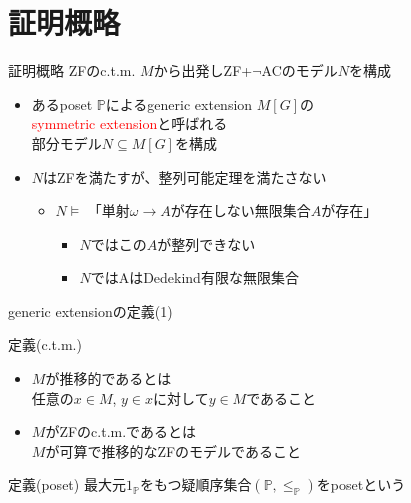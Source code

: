 \documentclass[17pt,aspectratio=169]{beamer}
\newcommand{\Pbb}{\mathbb{P}}
\begin{document}
\section{証明概略}
\begin{frame}{証明概略}
    \vspace{-4pt}
    ZFのc.t.m. $M$から出発しZF+$\neg$ACのモデル$N$を構成
    \vspace{-6pt}
    \begin{itemize}[itemsep=10pt]
        \item あるposet $\mathbb{P}$によるgeneric extension $M[G]$の\\
              \textcolor{red}{symmetric extension}と呼ばれる\\
              部分モデル$N \subseteq M[G]$を構成
        \item $N$はZFを満たすが、整列可能定理を満たさない
        \vspace{6pt}
        {\small \begin{itemize}
            \item $N \vDash $ 「単射$\omega \rightarrow A$が存在しない無限集合$A$が存在」
            \begin{itemize}
                \item $N$ではこの$A$が整列できない
                \item $N$ではAはDedekind有限な無限集合
            \end{itemize}
        \end{itemize}}
    \end{itemize}
\end{frame}

\begin{frame}{generic extensionの定義(1)}
    \vspace{-7pt}
    \begin{itembox}[l]{定義(c.t.m.)}
        {\small
            \begin{itemize}[itemsep=2pt]
                \item $M$が推移的であるとは\\
                      任意の$x \in M$, $y \in x$に対して$y \in M$であること
                \item $M$がZFのc.t.m.であるとは\\
                      $M$が可算で推移的なZFのモデルであること
            \end{itemize}
        }        
    \end{itembox}

    \begin{itembox}[l]{定義(poset)}
        {\small
            最大元$1_{\Pbb}$をもつ疑順序集合$(\Pbb, \le_{\Pbb})$をposetという
        }
    \end{itembox}
\end{frame}
\end{document}

